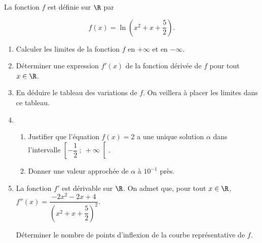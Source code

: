 La fonction $f$ est définie sur $\R$ par 

\[f(x) = \ln \left(x^2 + x + \dfrac{5}{2}\right).\]

\medskip

\begin{enumerate}
\item Calculer les limites de la fonction $f$ en $+\infty$ et en $-\infty$.
\item Déterminer une expression $f'(x)$ de la fonction dérivée de $f$ pour tout $x \in \R$.
\item En déduire le tableau des variations de $f$. On veillera à placer les limites dans ce tableau.
\item 
	\begin{enumerate}
		\item Justifier que l'équation $f(x) = 2$ a une unique solution $\alpha$ dans l'intervalle $\left[-\dfrac{1}{2}~;~+ \infty\right[$. 
		\item Donner une valeur approchée de $\alpha$ à $10^{-1}$ près.
 	\end{enumerate}
\item La fonction $f'$ est dérivable sur $\R$. On admet que, pour tout $x \in  \R$,\,  $f''(x) = \dfrac{-2x^2 - 2x + 4}{\left(x^2 + x + \dfrac{5}{2}\right)^2}$.

Déterminer le nombre de points d'inflexion de la courbe représentative de $f$.
\end{enumerate}

\bigskip

